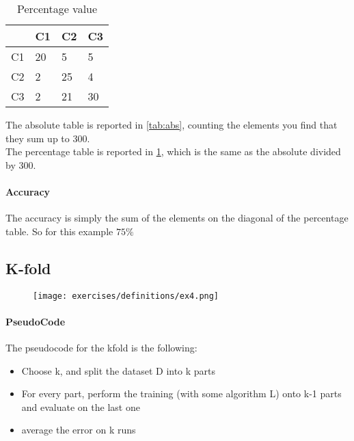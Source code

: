 \begin{table}[H]
\centering

\begin{tabular}{|
>{\columncolor[HTML]{EFEFEF}}l lll}
\hline
\cellcolor[HTML]{C0C0C0} & \cellcolor[HTML]{EFEFEF}C1 & \cellcolor[HTML]{EFEFEF}C2 & \cellcolor[HTML]{EFEFEF}C3 \\ \hline
C1                       & 20                         & 5                          & 5                          \\ \hline
C2                       & 2                          & 25                         & 4                          \\ \hline
C3                       & 2                          & 21                         & 30                         \\ \hline
\end{tabular}
\caption{Percentage value }
\label{tab:perc}
\end{table}

The absolute table is reported in \ref{tab:abs}, counting the elements you find that they sum up to 300.\\
The percentage table is reported in \ref{tab:perc}, which is the same as the absolute divided by 300.
\paragraph{Accuracy}
The accuracy is simply the sum of the elements on the diagonal of the percentage table. So for this example $75\%$


\subsection{K-fold }


\begin{figure}[H]
    \centering
    \texttt{[image: exercises/definitions/ex4.png]}
\end{figure}


\paragraph{PseudoCode}
The pseudocode for the kfold is the following:
\begin{itemize}
\item Choose k, and split the dataset D into k parts
\item For every part, perform the training (with some algorithm L) onto k-1 parts and evaluate on the last one 
\item average the error on k runs 
\end{itemize}

